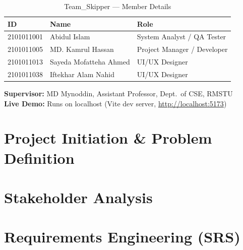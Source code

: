 \documentclass[11pt,a4paper]{report}
\begin{document}
\begin{table}[H]
\centering
\caption{Team\_Skipper — Member Details}
\label{tab:team}
\begin{tabularx}{\textwidth}{@{}lXX@{}}
\toprule
\textbf{ID} & \textbf{Name} & \textbf{Role} \\
\midrule
2101011001 & Abidul Islam          & System Analyst / QA Tester \\
2101011005 & MD. Kamrul Hassan     & Project Manager / Developer \\
2101011013 & Sayeda Mofatteha Ahmed & UI/UX Designer \\
2101011038 & Iftekhar Alam Nahid    & UI/UX Designer \\
\bottomrule
\end{tabularx}
\end{table}

\begin{center}
\textbf{Supervisor:} MD Mynoddin, Assistant Professor, Dept.\ of CSE, RMSTU\\[2pt]
\textbf{Live Demo:} Runs on localhost (Vite dev server, \url{http://localhost:5173})
\end{center}

\chapter{Project Initiation \& Problem Definition}
\label{sec:3-1}



\chapter{Stakeholder Analysis}
\label{sec:3-2}



\chapter{Requirements Engineering (SRS)}
\label{sec:3-3}
\end{document}
